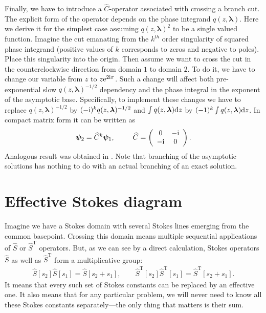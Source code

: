 \documentclass[12pt]{iopart}
\def\S{\widehat{S}}
\def\C{\widehat{C}}
\def\psii{\bm\psi}
\def\lmbd{\bm{\lambda}}
\def\Tp{\mathrm{T}}
\newcommand\phsintgrnd[1][z]{q(#1,\lmbd)}
\newcommand\predexp[1][z]{q(#1,\lmbd)^{-1/2}}
\begin{document}
Finally, we have to introduce a $\C$-operator associated with crossing a branch cut. The explicit form 
of the operator depends on the phase integrand $\phsintgrnd$. Here we derive it for the simplest case  
assuming $\phsintgrnd^2$ to be a single valued function. Imagine the cut emanating from the $k^{th}$ order
singularity of squared phase integrand (positive values of $k$ corresponds to zeros and negative to poles). 
Place this singularity into the origin. Then assume we want to cross the cut in the counterclockwise  
direction from domain $1$ to domain $2$. To do it, we have to change our variable 
from $z$ to $z \mathrm{e}^{2\mathrm{i}\pi}$. Such a change will affect both pre-exponential 
slow $\predexp$ dependency and the phase integral in the exponent of the asymptotic 
base. Specifically, to implement these changes we have to replace $\predexp$ by $(-\rmi)^k \predexp$ 
and $\int \phsintgrnd \rmd z$ by $(-1)^k \int \phsintgrnd \rmd z$. In compact matrix form 
it can be written as
\begin{eqnarray}
\psii_2 = \C^k \psii_1, \qquad
\C =  \left(\begin{array}{*{2}{c}} 0 & -\rmi \\ -\rmi & 0 \end{array}\right).    \label{eq:C}
\end{eqnarray}
Analogous result was obtained in \cite{frbook}. Note that branching of the asymptotic solutions has nothing to do with an actual branching  of  an exact solution.

\section{Effective Stokes diagram \label{sec:effsd}}
Imagine we have a Stokes domain with several Stokes lines emerging from the common basepoint.
Crossing this domain means multiple sequential applications of $\S$ or $\S^{\Tp}$ operators. But, as we
can see by a direct calculation, Stokes operators $\S$ as well as $\S^{\Tp}$ form a multiplicative
group:
\begin{eqnarray}
\S[s_2]\S[s_1] = \S[s_2 + s_1], \qquad
\S^{\Tp}[s_2]\S^{\Tp}[s_1] = \S^{\Tp}[s_2 + s_1].
\end{eqnarray}
It means that every such set of Stokes constants can be replaced by an effective one. It also means that
for any particular problem, we will never need to know all these Stokes constants separately---the only
thing that matters is their sum.
\end{document}
